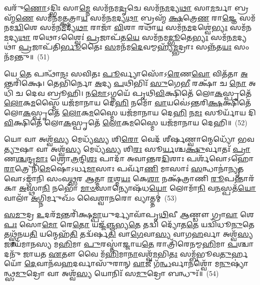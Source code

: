 {%
𑌵𑌰𑍁᳴\-\ul{𑌣𑍋}\-\-𑌽𑌦𑍍𑌭𑌿𑌃 𑌸𑌾\-\ul{𑌮𑍍𑌨𑍇} 𑌸𑌮᳴𑌨𑌮\-\ul{𑌦𑍃}\-𑌚𑍇 𑌸𑌮᳴𑌨\-\ul{𑌮}\-𑌦𑍍𑌯\-\ul{𑌥𑌾} 𑌸𑌾\-\ul{𑌮}\-𑌰𑍍𑌚𑌾 𑌬𑍍𑌰𑌹𑍍𑌮᳴\-\ul{𑌣𑍇} 𑌸𑌮᳴𑌨𑌮\-\ul{𑌤𑍍𑌕𑍍𑌷}\-𑌤𑍍𑌰𑌾\-\ul{𑌯} 𑌸𑌮᳴𑌨\-\ul{𑌮}\-𑌦𑍍𑌯\-\ul{𑌥𑌾} 𑌬𑍍𑌰𑌹𑍍𑌮᳴ \ul{𑌕𑍍𑌷}\-𑌤𑍍𑌰𑍇\-\ul{𑌣} 𑌰𑌾\-\ul{𑌜𑍍𑌞𑍇} 𑌸𑌮᳴𑌨𑌮\-\ul{𑌦𑍍𑌵𑌿}\-𑌶𑍇 𑌸𑌮᳴𑌨\-\ul{𑌮}\-𑌦𑍍𑌯\-\ul{𑌥𑌾} 𑌰𑌾𑌜𑌾᳴ \ul{𑌵𑌿}\-𑌶𑌾 𑌰𑌥𑌾᳴\-\ul{𑌯} 𑌸𑌮᳴𑌨\-\ul{𑌮}\-𑌦𑌶𑍍𑌵𑍇॑\-\ul{𑌭𑍍𑌯𑌃} 𑌸𑌮᳴𑌨\-\ul{𑌮}\-𑌦𑍍𑌯\-\ul{𑌥𑌾} 𑌰𑌥𑍋\-𑌽𑌶𑍍𑌵𑍈𑌃॑ \ul{𑌪𑍍𑌰}\-𑌜𑌾𑌪᳴𑌤\-\ul{𑌯𑍇} 𑌸𑌮᳴𑌨𑌮\-\ul{𑌦𑍍𑌭𑍂}\-𑌤𑍇\-\ul{𑌭𑍍𑌯𑌃} 𑌸𑌮᳴𑌨\-\ul{𑌮}\-𑌦𑍍𑌯𑌥𑌾॑ \ul{𑌪𑍍𑌰}\-𑌜𑌾𑌪᳴𑌤𑌿\-\ul{𑌰𑍍𑌭𑍂}\-𑌤𑍈𑌃 \ul{𑌸}\-𑌮𑌨᳴𑌮\-\ul{𑌦𑍇}\-𑌵𑌮𑍍𑌮𑌹𑍍𑌯᳴\-\ul{𑌮𑍍𑌭}\-𑌦𑍍𑌰𑌾𑌃 𑌸𑌨𑍍𑌨᳴𑌤\-\ul{𑌯𑌃} 𑌸𑌂 𑌨᳴𑌮𑌨𑍍𑌤𑍁॥~(51)

{\anuvakamend[{\-\ul{𑌅}\-𑌦𑍍𑌭𑍍𑌯𑌃 𑌸𑌮᳴𑌨\-\ul{𑌮}\-𑌦𑍍𑌯\-\ul{𑌥𑌾} 𑌮𑌹𑍍𑌯𑌂᳴ \ul{𑌚}\-𑌤𑍍𑌵𑌾𑌰𑌿᳴ 𑌚}]}%

𑌯𑍇 \ul{𑌤𑍇} 𑌪𑌨𑍍𑌥𑌾᳴𑌨𑌃 𑌸𑌵𑌿𑌤𑌃 \ul{𑌪𑍂}\-𑌰𑍍𑌵𑍍𑌯𑌾𑌸𑍋᳴\-𑌽\-\ul{𑌰𑍇}\-𑌣\-\ul{𑌵𑍋} 𑌵𑌿𑌤᳴𑌤𑌾 \ul{𑌅}\-𑌨𑍍𑌤𑌰𑌿᳴𑌕𑍍𑌷𑍇। 𑌤𑍇𑌭𑌿᳴𑌰𑍍𑌨𑍋 \ul{𑌅}\-𑌦𑍍𑌯 \ul{𑌪}\-𑌥𑌿𑌭𑌿𑌃᳴ \ul{𑌸𑍁}\-𑌗𑍇\-\ul{𑌭𑍀} 𑌰𑌕𑍍𑌷𑌾᳴ 𑌚 \ul{𑌨𑍋} 𑌅𑌧𑌿᳴ 𑌚 𑌦𑍇𑌵 𑌬𑍍𑌰𑍂𑌹𑌿। 𑌨\-\ul{𑌮𑍋}\-\-𑌽𑌗𑍍𑌨𑌯𑍇᳴ 𑌪𑍃𑌥𑌿\-\ul{𑌵𑌿}\-𑌕𑍍𑌷𑌿𑌤𑍇᳴ 𑌲𑍋\-\ul{𑌕}\-𑌸𑍍𑌪𑍃𑌤𑍇᳴ \ul{𑌲𑍋}\-𑌕\-\ul{𑌮}\-𑌸𑍍𑌮𑍈 𑌯𑌜᳴𑌮𑌾𑌨𑌾𑌯 𑌦𑍇\-\ul{𑌹𑌿} 𑌨𑌮𑍋᳴ \ul{𑌵𑌾}\-𑌯𑌵𑍇॑\-𑌽𑌨𑍍𑌤𑌰𑌿\-\ul{𑌕𑍍𑌷}\-𑌕𑍍𑌷𑌿𑌤𑍇᳴ 𑌲𑍋\-\ul{𑌕}\-𑌸𑍍𑌪𑍃𑌤𑍇᳴ \ul{𑌲𑍋}\-𑌕\-\ul{𑌮}\-𑌸𑍍𑌮𑍈 𑌯𑌜᳴𑌮𑌾𑌨𑌾𑌯 𑌦𑍇\-\ul{𑌹𑌿} 𑌨\-\ul{𑌮𑌃} 𑌸𑍂𑌰𑍍𑌯𑌾᳴𑌯 𑌦𑌿\-\ul{𑌵𑌿}\-𑌕𑍍𑌷𑌿𑌤𑍇᳴ 𑌲𑍋\-\ul{𑌕}\-𑌸𑍍𑌪𑍃𑌤𑍇᳴ \ul{𑌲𑍋}\-𑌕\-\ul{𑌮}\-𑌸𑍍𑌮𑍈 𑌯𑌜᳴𑌮𑌾𑌨𑌾𑌯 𑌦𑍇𑌹𑌿॥~(52)

{\anuvakamend[{𑌯𑍇 \ul{𑌤𑍇} 𑌚𑌤𑍁᳴𑌶𑍍𑌚𑌤𑍍𑌵𑌾𑌰𑌿𑍞𑌶𑌤𑍍}]}%

𑌯𑍋 𑌵𑌾 𑌅𑌶𑍍𑌵᳴\-\ul{𑌸𑍍𑌯} 𑌮𑍇𑌧𑍍𑌯᳴\-\ul{𑌸𑍍𑌯} 𑌶𑌿\-\ul{𑌰𑍋} 𑌵𑍇𑌦᳴ 𑌶𑍀𑌰𑍍\mbox{}\-\ul{𑌷}\-𑌣𑍍𑌵𑌾𑌨𑍍𑌮𑍇𑌧𑍍𑌯𑍋᳴ 𑌭𑌵\-\ul{𑌤𑍍𑌯𑍁}\-𑌷𑌾 𑌵𑌾 𑌅𑌶𑍍𑌵᳴\-\ul{𑌸𑍍𑌯} 𑌮𑍇𑌧𑍍𑌯᳴\-\ul{𑌸𑍍𑌯} 𑌶𑌿\-\ul{𑌰𑌃} 𑌸𑍂\-\ul{𑌰𑍍𑌯}\-𑌶𑍍𑌚\-\ul{𑌕𑍍𑌷𑍁}\-𑌰𑍍𑌵𑌾𑌤𑌃᳴ \ul{𑌪𑍍𑌰𑌾}\-𑌣\-\ul{𑌶𑍍𑌚}\-𑌨𑍍𑌦𑍍𑌰\-\ul{𑌮𑌾𑌃} 𑌶𑍍𑌰𑍋\-\ul{𑌤𑍍𑌰}\-𑌨𑍍𑌦𑌿\-\ul{𑌶𑌃} 𑌪𑌾𑌦𑌾᳴ 𑌅𑌵𑌾𑌨𑍍𑌤𑌰\-\ul{𑌦𑌿}\-𑌶𑌾𑌃 𑌪𑌰𑍍\mbox{}𑌶᳴𑌵𑍋\-𑌽𑌹𑍋\-\ul{𑌰𑌾}\-𑌤𑍍𑌰𑍇 𑌨𑌿᳴\-\ul{𑌮𑍇}\-𑌷𑍋॑\-𑌽𑌰𑍍𑌧\-\ul{𑌮𑌾}\-𑌸𑌾𑌃 𑌪𑌰𑍍𑌵𑌾᳴\-\ul{𑌣𑌿} 𑌮𑌾𑌸𑌾𑌃॑ \ul{𑌸}\-𑌨𑍍𑌧𑌾𑌨𑌾॑\-\ul{𑌨𑍍𑌯𑍃}\-𑌤𑌵𑍋\-𑌽𑌙𑍍𑌗𑌾᳴𑌨𑌿 𑌸𑌂𑌵\-\ul{𑌥𑍍𑌸}\-𑌰 \ul{𑌆}\-𑌤𑍍𑌮𑌾 \ul{𑌰}\-𑌶𑍍𑌮\-\ul{𑌯𑌃} 𑌕𑍇\-\ul{𑌶𑌾} 𑌨𑌕𑍍𑌷᳴𑌤𑍍𑌰𑌾𑌣𑌿 \ul{𑌰𑍂}\-𑌪𑌨𑍍𑌤𑌾𑌰᳴𑌕𑌾 \ul{𑌅}\-𑌸𑍍𑌥𑌾\-\ul{𑌨𑌿} 𑌨𑌭𑍋᳴ \ul{𑌮𑌾}\-\-\ul{𑍞}\-𑌸𑌾𑌨𑍍𑌯𑍋𑌷᳴𑌧\-\ul{𑌯𑍋} 𑌲𑍋𑌮𑌾᳴\-\ul{𑌨𑌿} 𑌵\-\ul{𑌨}\-𑌸𑍍𑌪𑌤᳴\-\ul{𑌯𑍋} 𑌵𑌾𑌲𑌾᳴ \ul{𑌅}\-𑌗𑍍𑌨𑌿𑌰𑍍𑌮𑍁𑌖𑌂᳴ 𑌵𑍈𑌶𑍍𑌵𑌾\-\ul{𑌨}\-𑌰𑍋 𑌵𑍍𑌯𑌾𑌤𑍍𑌤𑌮𑍍॑~(53)

\-\ul{𑌸}\-\-\ul{𑌮𑍁}\-𑌦𑍍𑌰 \ul{𑌉}\-𑌦𑌰᳴\-\ul{𑌮}\-𑌨𑍍𑌤𑌰𑌿᳴𑌕𑍍𑌷\-\ul{𑌮𑍍𑌪𑌾}\-𑌯𑍁𑌰𑍍𑌦𑍍𑌯𑌾𑌵𑌾᳴𑌪𑍃\-\ul{𑌥𑌿}\-𑌵𑍀 \ul{𑌆}\-𑌣𑍍𑌡𑍗 𑌗𑍍𑌰𑌾\-\ul{𑌵𑌾} 𑌶𑍇\-\ul{𑌪𑌃} 𑌸𑍋\-\ul{𑌮𑍋} 𑌰𑍇\-\ul{𑌤𑍋} 𑌯𑌜𑍍𑌜᳴\-\ul{𑌞𑍍𑌜}\-𑌭𑍍𑌯\-\ul{𑌤𑍇} 𑌤𑌦𑍍𑌵𑌿 𑌦𑍍𑌯𑍋᳴𑌤\-\ul{𑌤𑍇} 𑌯𑌦𑍍𑌵𑌿᳴𑌧𑍂\-\ul{𑌨𑍁}\-𑌤𑍇 𑌤𑌥𑍍𑌸𑍍𑌤᳴𑌨𑌯\-\ul{𑌤𑌿} 𑌯𑌨𑍍𑌮𑍇𑌹᳴\-\ul{𑌤𑌿} 𑌤𑌦𑍍𑌵᳴𑌰𑍍\mbox{}𑌷\-\ul{𑌤𑌿} 𑌵𑌾\-\ul{𑌗𑍇}\-𑌵𑌾\-\ul{𑌸𑍍𑌯} 𑌵𑌾𑌗\-\ul{𑌹}\-𑌰𑍍𑌵𑌾 𑌅𑌶𑍍𑌵᳴\-\ul{𑌸𑍍𑌯} 𑌜𑌾𑌯᳴𑌮𑌾𑌨𑌸𑍍𑌯 𑌮\-\ul{𑌹𑌿}\-𑌮𑌾 \ul{𑌪𑍁}\-𑌰𑌸𑍍𑌤𑌾॑𑌜𑍍𑌜𑌾𑌯\-\ul{𑌤𑍇} 𑌰𑌾𑌤𑍍𑌰𑌿᳴𑌰𑍇𑌨𑌮𑍍𑌮\-\ul{𑌹𑌿}\-𑌮𑌾 \ul{𑌪}\-𑌶𑍍𑌚𑌾𑌦𑌨𑍁᳴ 𑌜𑌾𑌯𑌤 \ul{𑌏}\-𑌤𑍗 𑌵𑍈 𑌮᳴\-\ul{𑌹𑌿}\-𑌮𑌾\-\ul{𑌨𑌾}\-𑌵𑌶𑍍𑌵᳴\-\ul{𑌮}\-𑌭𑌿\-\ul{𑌤𑌃} 𑌸𑌮𑍍𑌬᳴𑌭𑍂𑌵\-\ul{𑌤𑍁}\-𑌰𑍍\mbox{}𑌹𑌯𑍋᳴ \ul{𑌦𑍇}\-𑌵𑌾𑌨᳴𑌵\-\ul{𑌹}\-𑌦𑌰𑍍𑌵𑌾𑌸𑍁᳴𑌰𑌾𑌨𑍍 \ul{𑌵𑌾}\-𑌜𑍀 𑌗᳴\-\ul{𑌨𑍍𑌧}\-𑌰𑍍𑌵𑌾𑌨𑌶𑍍𑌵𑍋᳴ 𑌮\-\ul{𑌨𑍁}\-𑌷𑍍𑌯𑌾॑𑌨𑍍𑌥𑍍𑌸\-\ul{𑌮𑍁}\-𑌦𑍍𑌰𑍋 𑌵𑌾 𑌅𑌶𑍍𑌵᳴\-\ul{𑌸𑍍𑌯} 𑌯𑍋𑌨𑌿𑌃᳴ 𑌸\-\ul{𑌮𑍁}\-𑌦𑍍𑌰𑍋 𑌬𑌨𑍍𑌧𑍁𑌃᳴॥~(54)

}
